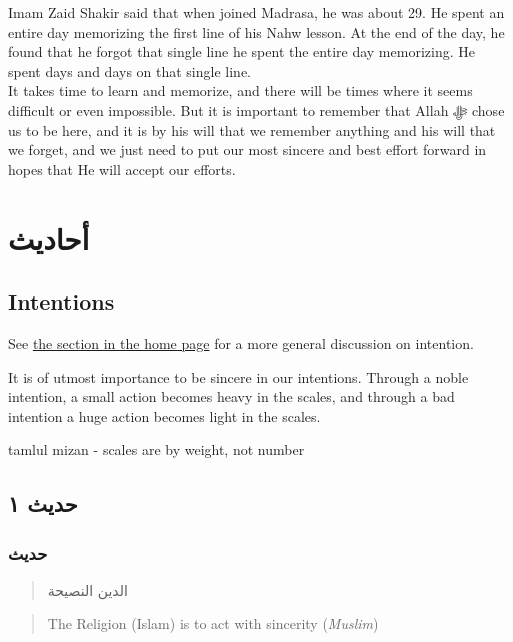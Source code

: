 \documentclass[
]{book}
\begin{document}
Imam Zaid Shakir said that when joined Madrasa, he was about 29. He spent an entire day memorizing the first line of his Nahw lesson. At the end of the day, he found that he forgot that single line he spent the entire day memorizing. He spent days and days on that single line.\\
It takes time to learn and memorize, and there will be times where it seems difficult or even impossible. But it is important to remember that Allah ﷻ chose us to be here, and it is by his will that we remember anything and his will that we forget, and we just need to put our most sincere and best effort forward in hopes that He will accept our efforts.

\hypertarget{ux623ux62dux627ux62fux64aux62b}{%
\section{أحاديث}\label{ux623ux62dux627ux62fux64aux62b}}

\hypertarget{intentions}{%
\subsection{Intentions}\label{intentions}}

See \protect\hyperlink{intent}{the section in the home page} for a more general discussion on intention.

It is of utmost importance to be sincere in our intentions. Through a noble intention, a small action becomes heavy in the scales, and through a bad intention a huge action becomes light in the scales.

tamlul mizan - scales are by weight, not number

\hypertarget{ux62dux62fux64aux62b-ux661}{%
\subsection{حديث ١}\label{ux62dux62fux64aux62b-ux661}}

\hypertarget{ux62dux62fux64aux62b}{%
\subsubsection{حديث}\label{ux62dux62fux64aux62b}}

\begin{quote}
الدين النصيحة
\end{quote}

\begin{quote}
The Religion (Islam) is to act with sincerity (\emph{Muslim})
\end{quote}
\end{document}
